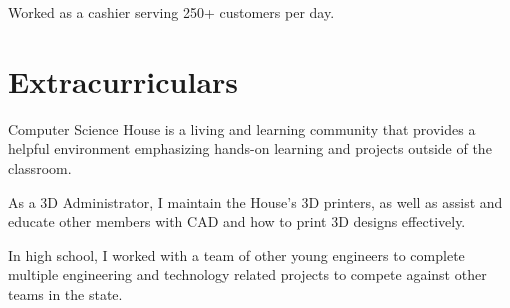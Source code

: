 \documentclass[letter]{comcv}
\begin{document}
    \begin{tightlist}
    \item Worked as a cashier serving 250+ customers per day.
    \end{tightlist}



\section{Extracurriculars}

\begin{tightlist}
    \item Computer Science House is a living and learning community that provides a helpful environment emphasizing hands-on learning and projects outside of the classroom.
	\item As a 3D Administrator, I maintain the House's 3D printers, as well as assist and educate other members with CAD and how to print 3D designs effectively.
\end{tightlist}


\begin{tightlist}
    \item In high school, I worked with a team of other young engineers to complete multiple engineering and technology related projects to compete against other teams in the state.
\end{tightlist}
\end{document}
